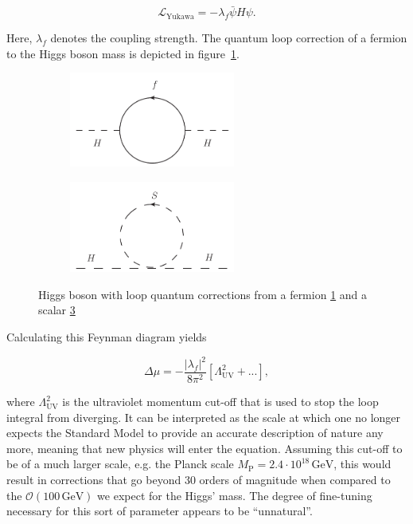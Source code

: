 \begin{equation}
  \label{eq:yukawacoup}
  \mathcal{L}_{\text{Yukawa}} = - \lambda_f \bar{\psi} H \psi.
\end{equation}

\noindent Here, $\lambda_f$ denotes the coupling strength. The quantum loop correction of a fermion to the Higgs boson mass is depicted in figure~\ref{fig:higgsfloop}.

\begin{figure}[ht!]
  \centering
  \begin{subfigure}[b]{0.49\textwidth}
    \centering
    \includegraphics[width=0.6\textwidth]{plots/higgsfloop.pdf}
    \caption{}
    \label{fig:higgsfloop}
  \end{subfigure}
  \begin{subfigure}[b]{0.49\textwidth}
    \centering
    \includegraphics[width=0.6\textwidth]{plots/higgssloop.pdf}
    \caption{}
    \label{fig:higgssloop}
  \end{subfigure}
  \caption{Higgs boson with loop quantum corrections from a fermion \ref{fig:higgsfloop} and a scalar \ref{fig:higgssloop}}
\end{figure}

\noindent Calculating this Feynman diagram yields

\begin{equation}
  \label{eq:higgsfcorr}
  \Delta \mu = - \frac{|\lambda_f|^2}{8 \pi^2} \left[ \Lambda^2_{\text{UV}} + ... \right],
\end{equation}

\noindent where $\Lambda^2_{\text{UV}}$ is the ultraviolet momentum cut-off that is used to stop the loop integral from diverging. It can be interpreted as the scale at which one no longer expects the Standard Model to provide an accurate description of nature any more, meaning that new physics will enter the equation. Assuming this cut-off to be of a much larger scale, e.g. the Planck scale $M_{\text{P}} = 2.4 \cdot 10^{18}\,\text{GeV}$, this would result in corrections that go beyond 30 orders of magnitude when compared to the $\mathcal{O}(100\,\text{GeV})$ we expect for the Higgs' mass. The degree of fine-tuning necessary for this sort of parameter appears to be ``unnatural''.

